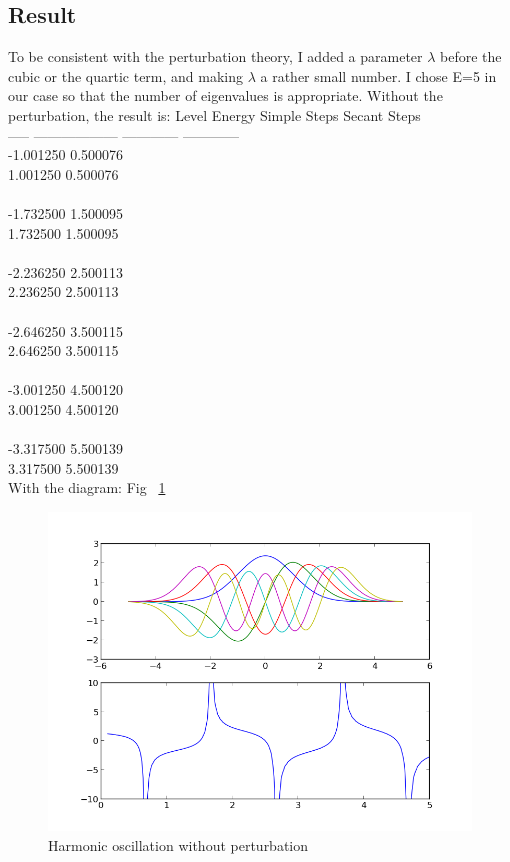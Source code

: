 \documentclass[11pt,letterpaper]{article}
\begin{document}
\subsection{Result}

To be consistent with the perturbation theory, I added a parameter $\lambda$ before the cubic or the quartic term, and making $\lambda$ a rather small number. I chose E=5 in our case so that the number of eigenvalues is appropriate.
Without the perturbation, the result is: 
 Level       Energy           Simple Steps   Secant Steps\\
 -----   ------------------   ------------   ------------\\
   -1.001250     0.500076\\
    1.001250     0.500076\\
\\
   -1.732500     1.500095\\
    1.732500     1.500095\\
\\
   -2.236250     2.500113\\
    2.236250     2.500113\\
\\
   -2.646250     3.500115\\
    2.646250     3.500115\\
\\
   -3.001250     4.500120\\
    3.001250     4.500120\\
\\
   -3.317500     5.500139\\
    3.317500     5.500139\\
With the diagram: Fig ~\ref{figure4}


\begin{figure}
\begin{center}
\includegraphics[width=0.8\linewidth,angle=0]{p2origin.png}
\caption{Harmonic oscillation without perturbation}
\label{figure4}
\end{center}
\end{figure}
\end{document}
